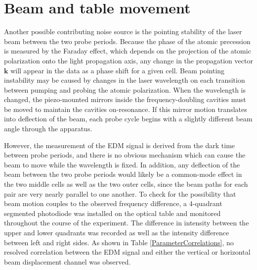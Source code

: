 \documentclass [10pt, twoside] {uwthesis}[2012/04/02]
\begin{document}


\section{Beam and table movement} %
Another possible contributing noise source is the pointing stability of the laser beam between the two probe periods. Because the phase of the atomic precession is measured by the Faraday effect, which depends on the projection of the atomic polarization onto the light propagation axis, any change in the propagation vector $\mathbf{k}$ will appear in the data as a phase shift for a given cell. Beam pointing instability may be caused by changes in the laser wavelength on each transition between pumping and probing the atomic polarization. When the wavelength is changed, the piezo-mounted mirrors inside the frequency-doubling cavities must be moved to maintain the cavities on-resonance. If this mirror motion translates into deflection of the beam, each probe cycle begins with a slightly different beam angle through the apparatus.

However, the measurement of the EDM signal is derived from the dark time between probe periods, and there is no obvious mechanism which can cause the beam to move while the wavelength is fixed. In addition, any deflection of the beam between the two probe periods would likely be a common-mode effect in the two middle cells as well as the two outer cells, since the beam paths for each pair are very nearly parallel to one another. To check for the possibility that beam motion couples to the observed frequency difference, a 4-quadrant segmented photodiode was installed on the optical table and monitored throughout the course of the experiment. The difference in intensity between the upper and lower quadrants was recorded as well as the intensity difference between left and right sides. As shown in Table \ref{ParameterCorrelations}, no resolved correlation between the EDM signal and either the vertical or horizontal beam displacement channel was observed.  
\end{document}
